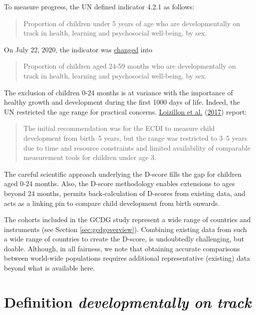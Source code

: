 \documentclass[
]{book}
\begin{document}
To measure progress, the UN defined indicator 4.2.1 as follows:

\begin{quote}
Proportion of children under 5 years of age who are developmentally on track in health, learning and psychosocial well-being, by sex.
\end{quote}

On July 22, 2020, the indicator was \href{https://unstats.un.org/sdgs/metadata/}{changed} into

\begin{quote}
Proportion of children aged 24-59 months who are developmentally on track in health, learning and psychosocial well-being, by sex.
\end{quote}

The exclusion of children 0-24 months is at variance with the importance of healthy growth and development during the first 1000 days of life. Indeed, the UN restricted the age range for practical concerns. \protect\hyperlink{ref-loizillon2017}{Loizillon et al.} (\protect\hyperlink{ref-loizillon2017}{2017}) report:

\begin{quote}
The initial recommendation was for the ECDI to measure child development from birth--5 years, but the range was restricted to 3--5 years due to time and resource constraints and limited availability of comparable measurement tools for children under age 3.
\end{quote}

The careful scientific approach underlying the D-score fills the gap for children aged 0-24 months. Also, the D-score methodology enables extensions to ages beyond 24 months, permits back-calculation of D-scores from existing data, and acts as a linking pin to compare child development from birth onwards.

The cohorts included in the GCDG study represent a wide range of countries and instruments (see Section \ref{sec:gcdgoverview}). Combining existing data from such a wide range of countries to create the D-score, is undoubtedly challenging, but doable. Although, in all fairness, we note that obtaining accurate comparisons between world-wide populations requires additional representative (existing) data beyond what is available here.

\hypertarget{sec:references}{%
\section{\texorpdfstring{Definition \emph{developmentally on track}}{Definition developmentally on track}}\label{sec:references}}
\end{document}
